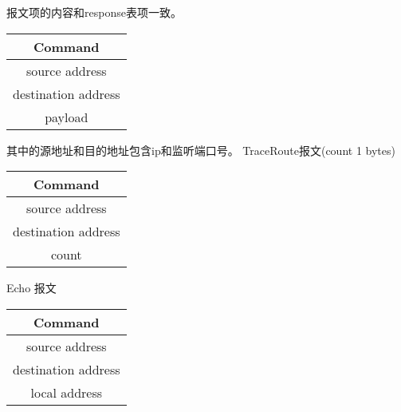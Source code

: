 报文项的内容和response表项一致。
\begin{table}[H]
	\centering
	\begin{tabular}{|c|}
		\hline
		Command \\
		\hline
		source address \\
		\hline
		destination address \\
		\hline
		payload \\
		\hline
	\end{tabular}		
\end{table}
其中的源地址和目的地址包含ip和监听端口号。
TraceRoute报文(count 1 bytes)
	\begin{table}[H]
	\centering
		\begin{tabular}{|c|}
			\hline
			Command \\
			\hline
			source address \\
			\hline
			destination address \\
			\hline
			count \\
			\hline
		\end{tabular}		
	\end{table}	

Echo 报文
	\begin{table}[H]
	\centering
		\begin{tabular}{|c|}
			\hline
			Command \\
			\hline
			source address \\
			\hline
			destination address \\
			\hline
			local address \\
			\hline
		\end{tabular}		
	\end{table}

